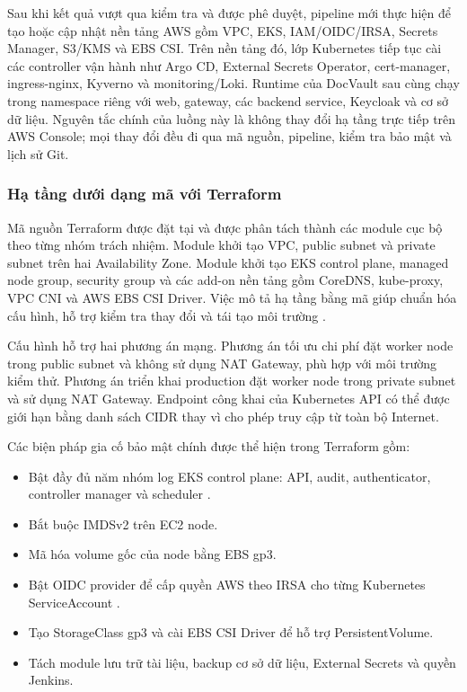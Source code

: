 Sau khi kết quả  vượt qua kiểm tra và được phê duyệt, pipeline mới thực hiện  để tạo hoặc cập nhật nền tảng AWS gồm VPC, EKS, IAM/OIDC/IRSA, Secrets Manager, S3/KMS và EBS CSI. Trên nền tảng đó, lớp Kubernetes tiếp tục cài các controller vận hành như Argo CD, External Secrets Operator, cert-manager, ingress-nginx, Kyverno và monitoring/Loki. Runtime của DocVault sau cùng chạy trong namespace riêng với web, gateway, các backend service, Keycloak và cơ sở dữ liệu. Nguyên tắc chính của luồng này là không thay đổi hạ tầng trực tiếp trên AWS Console; mọi thay đổi đều đi qua mã nguồn, pipeline, kiểm tra bảo mật và lịch sử Git.

\subsubsection{Hạ tầng dưới dạng mã với Terraform}

Mã nguồn Terraform được đặt tại  và được phân tách thành các module cục bộ theo từng nhóm trách nhiệm. Module  khởi tạo VPC, public subnet và private subnet trên hai Availability Zone. Module  khởi tạo EKS control plane, managed node group, security group và các add-on nền tảng gồm CoreDNS, kube-proxy, VPC CNI và AWS EBS CSI Driver. Việc mô tả hạ tầng bằng mã giúp chuẩn hóa cấu hình, hỗ trợ kiểm tra thay đổi và tái tạo môi trường \cite{terraform_docs}.

Cấu hình hỗ trợ hai phương án mạng. Phương án tối ưu chi phí đặt worker node trong public subnet và không sử dụng NAT Gateway, phù hợp với môi trường kiểm thử. Phương án triển khai production đặt worker node trong private subnet và sử dụng NAT Gateway. Endpoint công khai của Kubernetes API có thể được giới hạn bằng danh sách CIDR thay vì cho phép truy cập từ toàn bộ Internet.

Các biện pháp gia cố bảo mật chính được thể hiện trong Terraform gồm:

\begin{itemize}
  \item Bật đầy đủ năm nhóm log EKS control plane: API, audit, authenticator, controller manager và scheduler \cite{kubernetes_auditing}.
  \item Bắt buộc IMDSv2 trên EC2 node.
  \item Mã hóa volume gốc của node bằng EBS gp3.
  \item Bật OIDC provider để cấp quyền AWS theo IRSA cho từng Kubernetes ServiceAccount \cite{aws_eks_irsa}.
  \item Tạo StorageClass gp3 và cài EBS CSI Driver để hỗ trợ PersistentVolume.
  \item Tách module lưu trữ tài liệu, backup cơ sở dữ liệu, External Secrets và quyền Jenkins.
\end{itemize}

